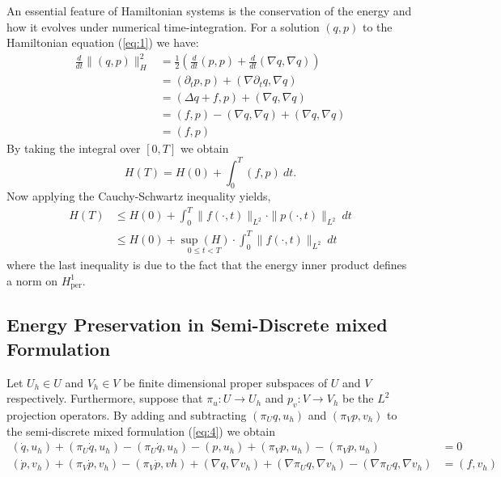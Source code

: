 \documentclass[12pt]{article}
\begin{document}
An essential feature of Hamiltonian systems is the conservation of the energy and how it evolves under numerical time-integration. For a solution $(q,p)$ to the Hamiltonian equation (\ref{eq:1}) we have:
\begin{equation} \label{eq:10}
\begin{aligned}
	\frac{d}{dt} \|(q,p) \|_H^2 &= \frac 1 2 \left( \frac{d}{dt}(p,p) + \frac{d}{dt}(\nabla q,\nabla q) \right) \\
	& = (\partial_t p, p) + (\nabla \partial_t q , \nabla q) \\
	& = ( \Delta q + f , p ) + (\nabla q , \nabla q) \\
	& = (f,p) - (\nabla q , \nabla q) + (\nabla q , \nabla q) \\
	& = (f,p)
\end{aligned}
\end{equation}
By taking the integral over $[0,T]$ we obtain
\begin{equation} \label{eq:11}
	H(T) = H(0) + \int_0^T (f,p)\ dt.
\end{equation}
Now applying the Cauchy-Schwartz inequality yields,
\begin{equation} \label{eq:12}
\begin{aligned}
	H(T) &\leq H(0) + \int_0^T \| f(\cdot,t) \|_{L^2} \cdot \| p(\cdot,t) \|_{L^2} \ dt \\
	&\leq H(0) + \underset{0\leq t < T}{\sup(H)} \cdot \int_0^T \| f(\cdot,t) \|_{L^2} \ dt
\end{aligned}
\end{equation}
where the last inequality is due to the fact that the energy inner product defines a norm on $H^1_{\text{per}}$.

\subsection{Energy Preservation in Semi-Discrete mixed Formulation}
Let $U_h\in U$ and $V_h\in V$ be finite dimensional proper subspaces of $U$ and $V$ respectively. Furthermore, suppose that $\pi_u:U\to U_h$ and $p_v:V\to V_h$ be the $L^2$ projection operators. By adding and subtracting $(\pi_Uq,u_h)$ and $(\pi_Vp,v_h)$ to the semi-discrete mixed formulation (\ref{eq:4}) we obtain
\begin{equation} \label{eq:13}
\begin{aligned}
	(\dot q,u_h) + (\pi_U\dot q,u_h) - (\pi_U \dot q, u_h) - (p,u_h) + (\pi_V p , u_h) - (\pi_V p , u_h) &= 0 \\
	(\dot p,v_h) + (\pi_V \dot p , v_h) - (\pi_V \dot p , vh) + (\nabla q , \nabla v_h) + (\nabla \pi_U q , \nabla v_h ) - (\nabla \pi_U q , \nabla v_h ) &= (f,v_h)
\end{aligned}
\end{equation}
\end{document}
